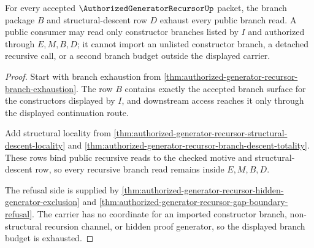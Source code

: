\begin{theorem}
\label{thm:authorized-generator-recursor-branch-budget-exhaustion}
For every accepted $\AuthorizedGeneratorRecursorUp$ packet, the branch package
$B$ and structural-descent row $D$ exhaust every public branch read. A public
consumer may read only constructor branches listed by $I$ and authorized
through $E,M,B,D$; it cannot import an unlisted constructor branch, a detached
recursive call, or a second branch budget outside the displayed carrier.
\end{theorem}
\begin{proof}
Start with branch exhaustion from
\autoref{thm:authorized-generator-recursor-branch-exhaustion}. The row $B$
contains exactly the accepted branch surface for the constructors displayed by
$I$, and downstream access reaches it only through the displayed continuation
route.

Add structural locality from
\autoref{thm:authorized-generator-recursor-structural-descent-locality} and
\autoref{thm:authorized-generator-recursor-branch-descent-totality}. These rows
bind public recursive reads to the checked motive and structural-descent row,
so every recursive branch read remains inside $E,M,B,D$.

The refusal side is supplied by
\autoref{thm:authorized-generator-recursor-hidden-generator-exclusion} and
\autoref{thm:authorized-generator-recursor-gap-boundary-refusal}. The carrier
has no coordinate for an imported constructor branch, non-structural recursion
channel, or hidden proof generator, so the displayed branch budget is
exhausted.
\end{proof}

